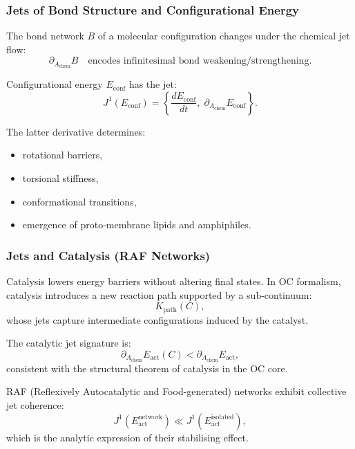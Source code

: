 \subsubsection{Jets of Bond Structure and Configurational Energy}

The bond network $B$ of a molecular configuration changes under the
chemical jet flow:
\[
\partial_{A_{\mathrm{chem}}} B
\quad\text{encodes infinitesimal bond weakening/strengthening.}
\]

Configurational energy $E_{\mathrm{conf}}$ has the jet:
\[
J^1(E_{\mathrm{conf}})=
\left\{
\frac{dE_{\mathrm{conf}}}{dt},\;
\partial_{A_{\mathrm{chem}}}E_{\mathrm{conf}}
\right\}.
\]

The latter derivative determines:

\begin{itemize}
    \item rotational barriers,
    \item torsional stiffness,
    \item conformational transitions,
    \item emergence of proto-membrane lipids and amphiphiles.
\end{itemize}



\subsubsection{Jets and Catalysis (RAF Networks)}

Catalysis lowers energy barriers without altering final states.
In OC formalism, catalysis introduces a new reaction path supported by a
sub-continuum:
\[
K_{\mathrm{path}}(C),
\]
whose jets capture intermediate configurations induced by the catalyst.

The catalytic jet signature is:
\[
\partial_{A_{\mathrm{chem}}}E_{\mathrm{act}}(C)
<
\partial_{A_{\mathrm{chem}}}E_{\mathrm{act}},
\]
consistent with the structural theorem of catalysis in the OC core.

RAF (Reflexively Autocatalytic and Food-generated) networks exhibit
collective jet coherence:
\[
J^1(E_{\mathrm{act}}^{\mathrm{network}})
\ll
J^1(E_{\mathrm{act}}^{\mathrm{isolated}}),
\]
which is the analytic expression of their stabilising effect.

